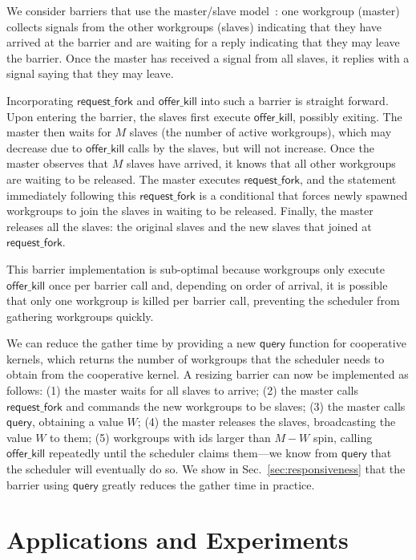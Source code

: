 \documentclass[sigconf]{acmart}
\newcommand{\mysec}{Sec.~}
\newcommand{\offerfork}{\mathsf{request\_fork}}
\newcommand{\offerkill}{\mathsf{offer\_kill}}
\newcommand{\keyword}[1]{\mathsf{#1}}
\begin{document}
{We consider barriers that use the master/slave model~\cite{XF10}: one
workgroup (master) collects signals from the other workgroups (slaves)
indicating that they have arrived at the barrier and are waiting for a
reply indicating that they may leave the barrier. Once the master has
received a signal from all slaves, it replies with a signal saying that
they may leave.

Incorporating $\offerfork$ and $\offerkill$ into such a barrier is
straight forward. Upon entering the barrier, the slaves first execute
$\offerkill$, possibly exiting. The master then waits for $M$ slaves
(the number of active workgroups), which may decrease due to
$\offerkill$ calls by the slaves, but will not increase. Once the
master observes that $M$ slaves have arrived, it knows that all other
workgroups are waiting to be released. The master executes
$\offerfork$, and the statement immediately following this
$\offerfork$ is a conditional that forces newly spawned workgroups to
join the slaves in waiting to be released. Finally, the master
releases all the slaves: the original slaves and the new slaves that
joined at $\offerfork$.

This barrier implementation is sub-optimal because workgroups only
execute $\offerkill$ once per barrier call and, depending on order of
arrival, it is possible that only one workgroup is killed per barrier
call, preventing the scheduler from gathering workgroups quickly.

We can reduce the gather time by providing a new
$\keyword{query}$ function for cooperative kernels, which returns the
number of workgroups that the scheduler needs to obtain from the
cooperative kernel.
%
%
A resizing barrier can now be implemented as follows: (1) the master
waits for all slaves to arrive; (2) the master calls $\offerfork$ and
commands the new workgroups to be slaves; (3) the master calls
$\keyword{query}$, obtaining a value $W$; (4) the master releases the
slaves, broadcasting the value $W$ to them; (5) workgroups with ids
larger than $M-W$ spin, calling $\offerkill$ repeatedly until the
scheduler claims them---we know from $\keyword{query}$ that the
scheduler will eventually do so.
We show in
\mysec\ref{sec:responsiveness} that the barrier using $\keyword{query}$ greatly
reduces the gather time in practice.


\section{Applications and Experiments}\label{sec:experiments}

}
\end{document}
